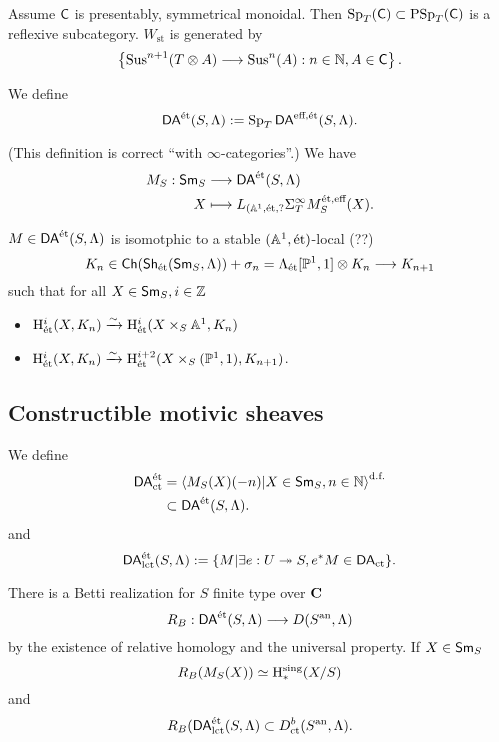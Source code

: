 \begin{proposition}
	Assume $\mathsf{C}$ is presentably, symmetrical monoidal. Then $\operatorname{Sp}_T(\mathsf{C})\subset \operatorname{PSp}_T(\mathsf{C})$ is a reflexive subcategory. $W_{\text{st}}$ is generated by
	\[
	\left\{ \Sus^{n+1}(T\otimes A) \to \Sus^{n}(A):n\in \N,A\in \C \right\} .
	\] 
\end{proposition}
\begin{definition}
	We define
	\[
		\mathsf{DA}^\text{\'et}(S,\Lambda) := \operatorname{Sp}_T\mathsf{DA}^{\text{eff},\text{\'et}}(S,\Lambda).
	\] 	
\end{definition}
(This definition is correct ``with $\infty$-categories''.)
We have
\begin{align*}
	M_S: \mathsf{Sm}_S &\longrightarrow \mathsf{DA}^\text{\'et}(S,\Lambda) \\
	X &\longmapsto L_{(\mathbb A^{1},\text{\'et},?}\Sigma_T^{\infty}M_S^{\text{\'et},\text{eff}}(X)
.\end{align*}
\begin{remark}
	$M\in \mathsf{DA}^\text{\'et}(S,\Lambda)$ is isomotphic to a stable $(\mathbb A^{1},\text{\'et})$-local (??)
	\[
		K_n\in \Ch(\Sh_{\text{\'et}}(\Sm_S,\Lambda)) + \sigma_n = \Lambda_{\text{\'et}}[\P^{1},1]\otimes K_n\to K_{n+1}
	\] 
	such that for all $X\in \mathsf{Sm}_S,i \in \mathbb Z$
	\begin{itemize}
		\item $\mathrm{H}_{\text{\'et}}^{i}(X,K_n)\xrightarrow{\sim} \mathrm{H}_{\text{\'et}}^{i}(X\times_S\mathbb A^{1},K_n)$ 
		\item $\mathrm{H}_{\text{\'et}}^{i}(X,K_n) \xrightarrow{\sim} \mathrm{H}_{\text{\'et}}^{i+2}(X\times_S(\mathbb{P}^{1},1),K_{n+1})$.
	\end{itemize}
\end{remark}

\subsection{Constructible motivic sheaves}
\begin{definition}
	We define 
	\begin{align*}
		\mathsf{DA}^\text{\'et}_{\text{ct}} &= \left<M_S(X)(-n)|X\in \mathsf{Sm}_S,n\in \mathbb N \right>^{\text{d.f.}} \\
				  &\subset \mathsf{DA}^\text{\'et}(S,\Lambda).
	\end{align*}
	and 
	\[
		\mathsf{DA}^\text{\'et}_{\text{lct}}(S,\Lambda) := \{M|\exists e:U\twoheadrightarrow S, e^{*}M\in \mathsf{DA}_{\text{ct}}\} .
	\] 
\end{definition}
There is a Betti realization for $S$ finite type over $\mathbf{C}$ 
\[
R_B: \DAet(S,\Lambda) \to D(S\an,\Lambda)
\] 
by the existence of relative homology and the universal property. If $X\in \mathsf{Sm}_S$ 
\[
R_B(M_S(X)) \simeq \mathrm{H}_*^{\text{sing}}(X /S)
\] 
and
\[
R_B(\mathsf{DA}^\text{\'et}_{\text{lct}}(S,\Lambda) \subset D^{b}_{\text{ct}}(S^\text{an},\Lambda).
\] 

